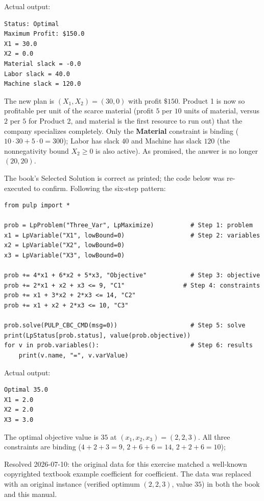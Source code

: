 Actual output:

\begin{verbatim}
Status: Optimal
Maximum Profit: $150.0
X1 = 30.0
X2 = 0.0
Material slack = -0.0
Labor slack = 40.0
Machine slack = 120.0
\end{verbatim}

The new plan is $(X_1, X_2) = (30, 0)$ with profit $\$150$. Product 1 is now
so profitable per unit of the scarce material (profit $5$ per $10$ units of
material, versus $2$ per $5$ for Product 2, and material is the first resource
to run out) that the company specializes completely. Only the
\textbf{Material} constraint is binding ($10 \cdot 30 + 5 \cdot 0 = 300$);
Labor has slack $40$ and Machine has slack $120$ (the nonnegativity bound
$X_2 \geq 0$ is also active). As promised, the answer is no longer $(20,20)$.


The book's Selected Solution is correct as printed; the code below was
re-executed to confirm. Following the six-step pattern:

\begin{verbatim}
from pulp import *

prob = LpProblem("Three_Var", LpMaximize)          # Step 1: problem
x1 = LpVariable("X1", lowBound=0)                  # Step 2: variables
x2 = LpVariable("X2", lowBound=0)
x3 = LpVariable("X3", lowBound=0)

prob += 4*x1 + 6*x2 + 5*x3, "Objective"            # Step 3: objective
prob += 2*x1 + x2 + x3 <= 9, "C1"                # Step 4: constraints
prob += x1 + 3*x2 + 2*x3 <= 14, "C2"
prob += x1 + x2 + 2*x3 <= 10, "C3"

prob.solve(PULP_CBC_CMD(msg=0))                    # Step 5: solve
print(LpStatus[prob.status], value(prob.objective))
for v in prob.variables():                         # Step 6: results
    print(v.name, "=", v.varValue)
\end{verbatim}

Actual output:

\begin{verbatim}
Optimal 35.0
X1 = 2.0
X2 = 2.0
X3 = 3.0
\end{verbatim}

The optimal objective value is $35$ at $(x_1, x_2, x_3) = (2, 2, 3)$.
All three constraints are binding ($4+2+3 = 9$, $2+6+6 = 14$, $2+2+6 = 10$);

\begin{qaflag}
Resolved 2026-07-10: the original data for this exercise matched a well-known copyrighted textbook example coefficient for coefficient. The data was replaced with an original instance (verified optimum $(2,2,3)$, value $35$) in both the book and this manual.
\end{qaflag}

